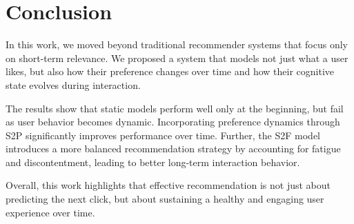 \section{Conclusion}

In this work, we moved beyond traditional recommender systems that focus only on short-term relevance. 
We proposed a system that models not just what a user likes, 
but also how their preference changes over time and how their cognitive state evolves during interaction.

The results show that static models perform well only at the beginning, 
but fail as user behavior becomes dynamic. 
Incorporating preference dynamics through S2P significantly improves performance over time. 
Further, the S2F model introduces a more balanced recommendation strategy by accounting for fatigue and discontentment, 
leading to better long-term interaction behavior.

Overall, this work highlights that effective recommendation is not just about predicting the next click, 
but about sustaining a healthy and engaging user experience over time.
